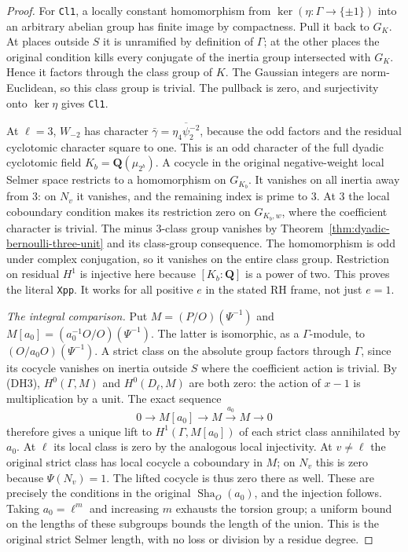 \begin{proof}
For \texttt{Cl1}, a locally constant homomorphism from
$\ker(\eta:\Gamma\to\{\pm1\})$ into an arbitrary abelian group
has finite image by compactness.  Pull it back to $G_K$.
At places outside $S$ it is unramified by definition of $\Gamma$;
at the other places the original condition kills every conjugate
of the inertia group intersected with $G_K$.  Hence it factors
through the class group of $K$.  The Gaussian integers are
norm-Euclidean, so this class group is trivial.  The pullback is
zero, and surjectivity onto $\ker\eta$ gives \texttt{Cl1}.

At $\ell=3$, $W_{-2}$ has character
$\bar\gamma=\overline{\eta_4\psi_2^{-2}}$, because the odd factors
and the residual cyclotomic character square to one.
This is an odd character of the full dyadic cyclotomic field
$K_b=\mathbf Q(\mu_{2^b})$.
A cocycle in the original negative-weight local Selmer space
restricts to a homomorphism on $G_{K_b}$.
It vanishes on all inertia away from $3$: on $N_v$ it vanishes,
and the remaining index is prime to $3$.  At $3$ the local
coboundary condition makes its restriction zero on
$G_{K_b,w}$, where the coefficient character is trivial.
The minus $3$-class group vanishes by
Theorem~\ref{thm:dyadic-bernoulli-three-unit} and its class-group
consequence.  The homomorphism is odd under complex conjugation,
so it vanishes on the entire class group.  Restriction on
residual $H^1$ is injective here because $[K_b:\mathbf Q]$
is a power of two.  This proves the literal \texttt{Xpp}.
It works for all positive $e$ in the stated RH frame, not just $e=1$.

\emph{The integral comparison.}
Put $M=(P/O)(\Psi^{-1})$ and $M[a_0]=(a_0^{-1}O/O)(\Psi^{-1})$.
The latter is isomorphic, as a $\Gamma$-module, to
$(O/a_0O)(\Psi^{-1})$.  A strict class on the absolute group
factors through $\Gamma$, since its cocycle vanishes on inertia
outside $S$ where the coefficient action is trivial.
By (DH3), $H^0(\Gamma,M)$ and $H^0(D_\ell,M)$ are both zero:
the action of $x-1$ is multiplication by a unit.
The exact sequence
\[
                    0\to M[a_0]\to M
                         \xrightarrow{a_0}M\to0
\]
therefore gives a unique lift to $H^1(\Gamma,M[a_0])$
of each strict class annihilated by $a_0$.
At $\ell$ its local class is zero by the analogous local
injectivity.  At $v\ne\ell$ the original strict class has local
cocycle a coboundary in $M$; on $N_v$ this is zero because
$\Psi(N_v)=1$.  The lifted cocycle is thus zero there as well.
These are precisely the conditions in the original
$\operatorname{Sha}_O(a_0)$, and the injection follows.
Taking $a_0=\ell^m$ and increasing $m$ exhausts the torsion
group; a uniform bound on the lengths of these subgroups
bounds the length of the union.  This is the original
strict Selmer length, with no loss or division by a residue
degree.
\end{proof}

